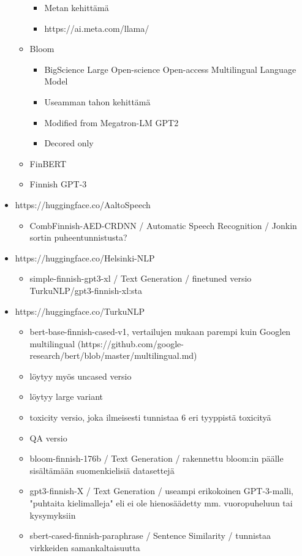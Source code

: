 \begin{itemize}
\begin{itemize}
\begin{itemize}
      \item Metan kehittämä
      \item https://ai.meta.com/llama/
    \end{itemize}
    \item Bloom
    \begin{itemize}
      \item BigScience Large Open-science Open-access Multilingual Language Model
      \item Useamman tahon kehittämä
      \item Modified from Megatron-LM GPT2
      \item Decored only
    \end{itemize}
    \item FinBERT
    \item Finnish GPT-3
  \end{itemize}
  \item https://huggingface.co/AaltoSpeech
  \begin{itemize}
    \item CombFinnish-AED-CRDNN / Automatic Speech Recognition / Jonkin sortin puheentunnistusta?
  \end{itemize}
  \item https://huggingface.co/Helsinki-NLP
  \begin{itemize}
    \item simple-finnish-gpt3-xl / Text Generation / finetuned versio TurkuNLP/gpt3-finnish-xl:sta
  \end{itemize}
  \item https://huggingface.co/TurkuNLP
  \begin{itemize}
    \item bert-base-finnish-cased-v1, vertailujen mukaan parempi kuin Googlen multilingual (https://github.com/google-research/bert/blob/master/multilingual.md)
    \item löytyy myös uncased versio
    \item löytyy large variant
    \item toxicity versio, joka ilmeisesti tunnistaa 6 eri tyyppistä toxicityä
    \item QA versio
    \item bloom-finnish-176b / Text Generation / rakennettu bloom:in päälle sisältämään suomenkielisiä datasettejä
    \item gpt3-finnish-X / Text Generation / useampi erikokoinen GPT-3-malli, "puhtaita kielimalleja" eli ei ole hienosäädetty mm. vuoropuheluun tai kysymyksiin
    \item sbert-cased-finnish-paraphrase / Sentence Similarity / tunnistaa virkkeiden samankaltaisuutta

\end{itemize}
\end{itemize}
